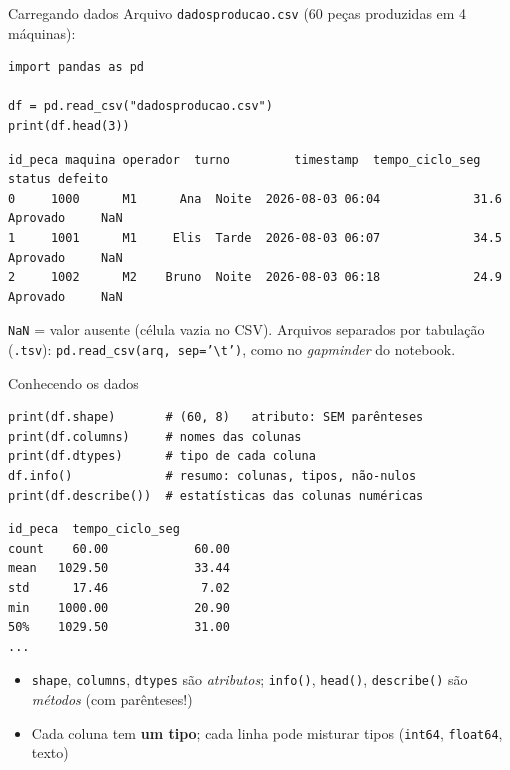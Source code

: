 \documentclass[aspectratio=169,10pt,t]{beamer}
\begin{document}
\begin{frame}[fragile]{Carregando dados}
  Arquivo \texttt{dadosproducao.csv} (60 peças produzidas em 4 máquinas):
\begin{lstlisting}
import pandas as pd

df = pd.read_csv("dadosproducao.csv")
print(df.head(3))
\end{lstlisting}
\begin{lstlisting}[style=saida,basicstyle=\ttfamily\scriptsize]
   id_peca maquina operador  turno         timestamp  tempo_ciclo_seg    status defeito
0     1000      M1      Ana  Noite  2026-08-03 06:04             31.6  Aprovado     NaN
1     1001      M1     Elis  Tarde  2026-08-03 06:07             34.5  Aprovado     NaN
2     1002      M2    Bruno  Noite  2026-08-03 06:18             24.9  Aprovado     NaN
\end{lstlisting}
  \small \texttt{NaN} = valor ausente (célula vazia no CSV). Arquivos separados por tabulação (\texttt{.tsv}): \texttt{pd.read\_csv(arq, sep='\textbackslash t')}, como no \emph{gapminder} do notebook.
\end{frame}

\begin{frame}[fragile]{Conhecendo os dados}
\begin{lstlisting}
print(df.shape)       # (60, 8)   atributo: SEM parênteses
print(df.columns)     # nomes das colunas
print(df.dtypes)      # tipo de cada coluna
df.info()             # resumo: colunas, tipos, não-nulos
print(df.describe())  # estatísticas das colunas numéricas
\end{lstlisting}
\begin{lstlisting}[style=saida,basicstyle=\ttfamily\scriptsize]
       id_peca  tempo_ciclo_seg
count    60.00            60.00
mean   1029.50            33.44
std      17.46             7.02
min    1000.00            20.90
50%    1029.50            31.00
...
\end{lstlisting}
  \begin{itemize}\small
    \item \texttt{shape}, \texttt{columns}, \texttt{dtypes} são \emph{atributos}; \texttt{info()}, \texttt{head()}, \texttt{describe()} são \emph{métodos} (com parênteses!)
    \item Cada coluna tem \textbf{um tipo}; cada linha pode misturar tipos (\texttt{int64}, \texttt{float64}, texto)
  \end{itemize}
\end{frame}
\end{document}
